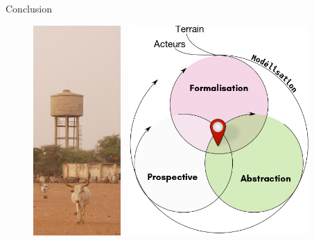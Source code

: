 \documentclass[newPxFont]{beamer}
\begin{document}
\begin{frame}[c]{Conclusion}
\vspace{-2em}
  \begin{figure}
    \centering
    \includegraphics[height=8cm]{img/widou}~
    \includegraphics[height=8cm]{img/atouts}
  \end{figure}
\end{frame}
\end{document}
